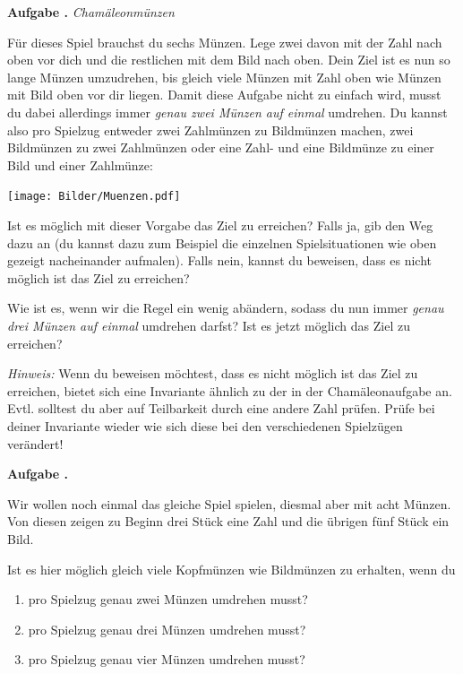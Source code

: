 \documentclass[a4paper,ngerman,12pt]{scrartcl}
\theoremstyle{definition}
\theoremstyle{plain}
\theoremstyle{remark}
\newlength{\aufgabenskip}
\newcounter{aufgabennummer}
\newenvironment{aufgabe}[1]{
	\addtocounter{aufgabennummer}{1}
	\textbf{Aufgabe \theaufgabennummer.} \emph{#1} \par
}{\vspace{\aufgabenskip}}
\begin{document}
\begin{aufgabe}{Chamäleonmünzen}
	Für dieses Spiel brauchst du sechs Münzen. Lege zwei davon mit der Zahl nach oben vor dich und die restlichen mit dem Bild nach oben. Dein Ziel ist es nun so lange Münzen umzudrehen, bis gleich viele Münzen mit Zahl oben wie Münzen mit Bild oben vor dir liegen. Damit diese Aufgabe nicht zu einfach wird, musst du dabei allerdings immer \emph{genau zwei Münzen auf einmal } umdrehen. Du kannst also pro Spielzug entweder zwei Zahlmünzen zu Bildmünzen machen, zwei Bildmünzen zu zwei Zahlmünzen oder eine Zahl- und eine Bildmünze zu einer Bild und einer Zahlmünze:
	
	\begin{center}
		\texttt{[image: Bilder/Muenzen.pdf]}
	\end{center}
	
	Ist es möglich mit dieser Vorgabe das Ziel zu erreichen? Falls ja, gib den Weg dazu an (du kannst dazu zum Beispiel die einzelnen Spielsituationen wie oben gezeigt nacheinander aufmalen). Falls nein, kannst du beweisen, dass es nicht möglich ist das Ziel zu erreichen? 
	
	Wie ist es, wenn wir die Regel ein wenig abändern, sodass du nun immer \emph{genau drei Münzen auf einmal} umdrehen darfst? Ist es jetzt möglich das Ziel zu erreichen?
	
	\emph{Hinweis:} Wenn du beweisen möchtest, dass es nicht möglich ist das Ziel zu erreichen, bietet sich eine Invariante ähnlich zu der in der Chamäleonaufgabe an. Evtl. solltest du aber auf Teilbarkeit durch eine andere Zahl prüfen. Prüfe bei deiner Invariante wieder wie sich diese bei den verschiedenen Spielzügen verändert!
\end{aufgabe}

\begin{aufgabe}{}
	Wir wollen noch einmal das gleiche Spiel spielen, diesmal aber mit acht Münzen. Von diesen zeigen zu Beginn drei Stück eine Zahl und die übrigen fünf Stück ein Bild.
	
	Ist es hier möglich gleich viele Kopfmünzen wie Bildmünzen zu erhalten, wenn du
	\begin{enumerate}
		\item pro Spielzug genau zwei Münzen umdrehen musst?
		\item pro Spielzug genau drei Münzen umdrehen musst?
		\item pro Spielzug genau vier Münzen umdrehen musst?
	\end{enumerate}
\end{aufgabe}
\end{document}
